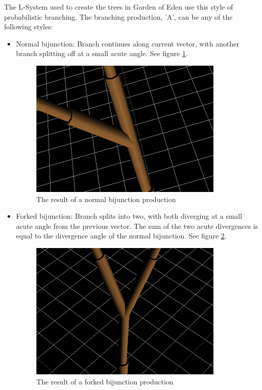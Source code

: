 \documentclass{article}
\newcommand{\tab}{\hspace*{2em}}
\begin{document}
    \tab The L-System used to create the trees in Garden of Eden use this style of probabilistic
branching. The branching production, 'A', can be any of the following styles:
    \begin{itemize}
        \item Normal bijunction: Branch continues along current vector, with another branch
splitting off at a small acute angle. See figure \ref{fig:fig/bijunct}.
        \begin{figure}[h]
            \centering
            \includegraphics{fig/bijunct}
            \caption[Normal Bijunction]{The result of a normal bijunction production}
            \label{fig:fig/bijunct}

        \end{figure}
        \item Forked bijunction: Branch splits into two, with both diverging at a small acute angle
from the previous vector. The sum of the two acute divergences is equal to the divergence angle of
the normal bijunction\cite{honda71}. See figure \ref{fig:fig/fbijunct}.
        \begin{figure}[h]
            \centering
            \includegraphics{fig/fbijunct}
            \caption[Forked Bijunction]{The result of a forked bijunction production}
            \label{fig:fig/fbijunct}


\end{figure}
\end{itemize}
\end{document}
